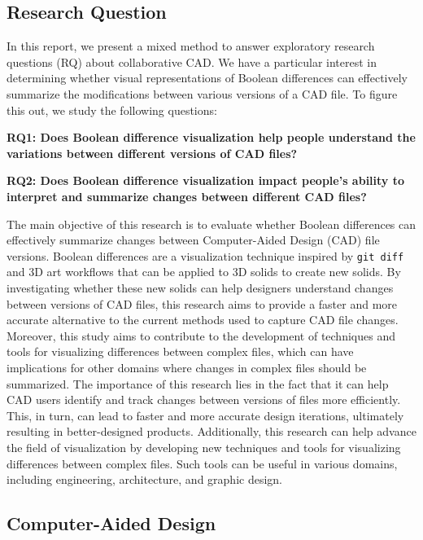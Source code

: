 \documentclass[sigconf,authorversion,nonacm]{acmart}
\begin{document}
\subsection{Research Question}

In this report, we present a mixed method to answer exploratory research questions (RQ) about collaborative CAD.
We have a particular interest in determining whether visual representations of Boolean differences can effectively summarize the modifications between various versions of a CAD file.
To figure this out, we study the following questions:

\textbf{RQ1: Does Boolean difference visualization help people understand the variations between different versions of CAD files?}

\textbf{RQ2: Does Boolean difference visualization impact people's ability to interpret and summarize changes between different CAD files?}

The main objective of this research is to evaluate whether Boolean differences can effectively summarize changes between Computer-Aided Design (CAD) file versions.
Boolean differences are a visualization technique inspired by \texttt{git diff} and 3D art workflows that can be applied to 3D solids to create new solids.
By investigating whether these new solids can help designers understand changes between versions of CAD files, this research aims to provide a faster and more accurate alternative to the current methods used to capture CAD file changes.
Moreover, this study aims to contribute to the development of techniques and tools for visualizing differences between complex files, which can have implications for other domains where changes in complex files should be summarized.
The importance of this research lies in the fact that it can help CAD users identify and track changes between versions of files more efficiently.
This, in turn, can lead to faster and more accurate design iterations, ultimately resulting in better-designed products.
Additionally, this research can help advance the field of visualization by developing new techniques and tools for visualizing differences between complex files.
Such tools can be useful in various domains, including engineering, architecture, and graphic design.

\subsection{Computer-Aided Design}
\end{document}
